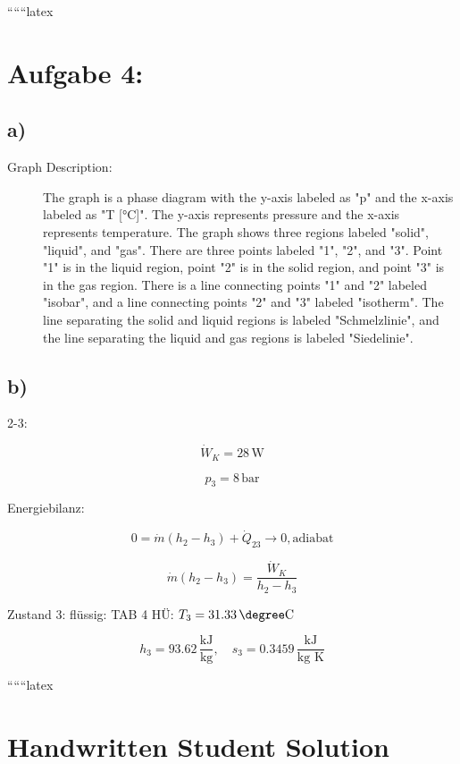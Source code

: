 
``````latex


\section*{Aufgabe 4:}

\subsection*{a)}

\begin{description}
    \item[Graph Description:] The graph is a phase diagram with the y-axis labeled as "p" and the x-axis labeled as "T [°C]". The y-axis represents pressure and the x-axis represents temperature. The graph shows three regions labeled "solid", "liquid", and "gas". There are three points labeled "1", "2", and "3". Point "1" is in the liquid region, point "2" is in the solid region, and point "3" is in the gas region. There is a line connecting points "1" and "2" labeled "isobar", and a line connecting points "2" and "3" labeled "isotherm". The line separating the solid and liquid regions is labeled "Schmelzlinie", and the line separating the liquid and gas regions is labeled "Siedelinie".
\end{description}

\subsection*{b)}

2-3:

\[
\dot{W}_K = 28 \, \text{W}
\]

\[
p_3 = 8 \, \text{bar}
\]

Energiebilanz:

\[
0 = \dot{m} (h_2 - h_3) + \dot{Q}_{23} \rightarrow 0, \text{adiabat}
\]

\[
\dot{m} (h_2 - h_3) = \frac{\dot{W}_K}{h_2 - h_3}
\]

Zustand 3: flüssig: TAB 4 HÜ: \(T_3 = 31.33 \, \degree \text{C}\)

\[
h_3 = 93.62 \, \frac{\text{kJ}}{\text{kg}}, \quad s_3 = 0.3459 \, \frac{\text{kJ}}{\text{kg K}}
\]

``````latex

\section*{Handwritten Student Solution}

